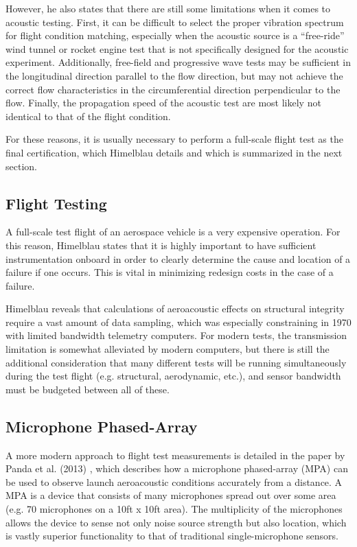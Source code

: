 \documentclass[]{aiaa-tc}%
\begin{document}
However, he also states that there are still some limitations when it comes to acoustic testing.  First, it can be difficult to select the proper vibration spectrum for flight condition matching, especially when the acoustic source is a ``free-ride'' wind tunnel or rocket engine test that is not specifically designed for the acoustic experiment.  Additionally, free-field and progressive wave tests may be sufficient in the longitudinal direction parallel to the flow direction, but may not achieve the correct flow characteristics in the circumferential direction perpendicular to the flow.  Finally, the propagation speed of the acoustic test are most likely not identical to that of the flight condition.

For these reasons, it is usually necessary to perform a full-scale flight test as the final certification, which Himelblau details and which is summarized in the next section.

\subsection{Flight Testing}

A full-scale test flight of an aerospace vehicle is a very expensive operation.  For this reason, Himelblau states that it is highly important to have sufficient instrumentation onboard in order to clearly determine the cause and location of a failure if one occurs.  This is vital in minimizing redesign costs in the case of a failure.

Himelblau reveals that calculations of aeroacoustic effects on structural integrity require a vast amount of data sampling, which was especially constraining in 1970 with limited bandwidth telemetry computers.  For modern tests, the transmission limitation is somewhat alleviated by modern computers, but there is still the additional consideration that many different tests will be running simultaneously during the test flight (e.g. structural, aerodynamic, etc.), and sensor bandwidth must be budgeted between all of these.


\subsection{Microphone Phased-Array}

A more modern approach to flight test measurements is detailed in the paper by Panda et al. (2013) \cite{MicrophonePhasedArray}, which describes how a microphone phased-array (MPA) can be used to observe launch aeroacoustic conditions accurately from a distance.  A MPA is a device that consists of many microphones spread out over some area (e.g. 70 microphones on a 10ft x 10ft area).  The multiplicity of the microphones allows the device to sense not only noise source strength but also location, which is vastly superior functionality to that of traditional single-microphone sensors.
\end{document}
